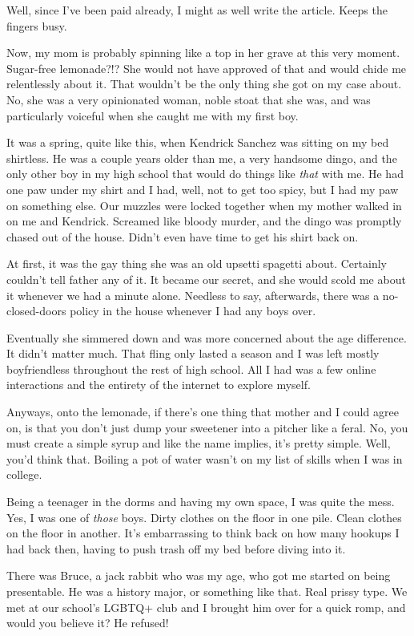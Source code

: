 Well, since I've been paid already, I might as well write the article.
Keeps the fingers busy.

Now, my mom is probably spinning like a top in her grave at this very
moment. Sugar-free lemonade?!? She would not have approved of that and
would chide me relentlessly about it. That wouldn't be the only thing
she got on my case about. No, she was a very opinionated woman, noble
stoat that she was, and was particularly voiceful when she caught me
with my first boy.

It was a spring, quite like this, when Kendrick Sanchez was sitting on
my bed shirtless. He was a couple years older than me, a very handsome
dingo, and the only other boy in my high school that would do things
like \emph{that} with me. He had one paw under my shirt and I had, well,
not to get too spicy, but I had my paw on something else. Our muzzles
were locked together when my mother walked in on me and Kendrick.
Screamed like bloody murder, and the dingo was promptly chased out of
the house. Didn't even have time to get his shirt back on.

At first, it was the gay thing she was an old upsetti spagetti about.
Certainly couldn't tell father any of it. It became our secret, and she
would scold me about it whenever we had a minute alone. Needless to say,
afterwards, there was a no-closed-doors policy in the house whenever I
had any boys over.

Eventually she simmered down and was more concerned about the age
difference. It didn't matter much. That fling only lasted a season and I
was left mostly boyfriendless throughout the rest of high school. All I
had was a few online interactions and the entirety of the internet to
explore myself.

Anyways, onto the lemonade, if there's one thing that mother and I could
agree on, is that you don't just dump your sweetener into a pitcher like
a feral. No, you must create a simple syrup and like the name implies,
it's pretty simple. Well, you'd think that. Boiling a pot of water
wasn't on my list of skills when I was in college.

Being a teenager in the dorms and having my own space, I was quite the
mess. Yes, I was one of \emph{those} boys. Dirty clothes on the floor in
one pile. Clean clothes on the floor in another. It's embarrassing to
think back on how many hookups I had back then, having to push trash off
my bed before diving into it.

There was Bruce, a jack rabbit who was my age, who got me started on
being presentable. He was a history major, or something like that. Real
prissy type. We met at our school's LGBTQ+ club and I brought him over
for a quick romp, and would you believe it? He refused!


